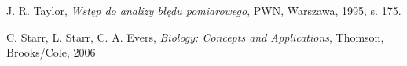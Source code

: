 \documentclass[10pt,a4paper]{article}
\begin{document}
\begin{center}
\begin{thebibliography}{9}

 
 J. R. Taylor,
 \emph{Wstęp do analizy błędu pomiarowego},
 PWN, Warszawa, 1995, s. 175.
 
 C. Starr, L. Starr, C. A. Evers, 
 \emph{Biology: Concepts and Applications},
 Thomson, Brooks/Cole, 2006 


 \end{thebibliography}

\end{center}
\end{document}
